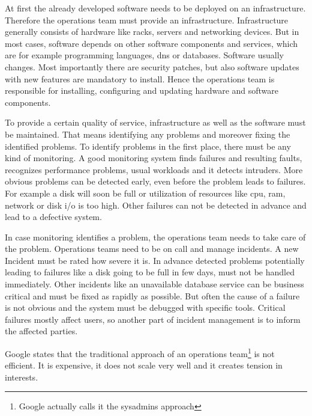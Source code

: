 At first the already developed software needs to be deployed on an infrastructure. Therefore the operations team must provide an infrastructure. Infrastructure generally consists of hardware like racks, servers and networking devices. But in most cases, software depends on other software components and services, which are for example programming languages, dns or databases. Software usually changes. Most importantly there are security patches, but also software updates with new features are mandatory to install. Hence the operations team is responsible for installing, configuring and updating hardware and software components.

To provide a certain quality of service, infrastructure as well as the software must be maintained. That means identifying any problems and moreover fixing the identified problems. To identify problems in the first place, there must be any kind of monitoring. A good monitoring system\cite[p. 127/8]{devops} finds failures and resulting faults, recognizes performance problems, usual workloads and it detects intruders. More obvious problems can be detected early, even before the problem leads to failures. For example a disk will soon be full or utilization of resources like cpu, ram, network or disk i/o is too high. Other failures can not be detected in advance and lead to a defective system.

In case monitoring identifies a problem, the operations team needs to take care of the problem. Operations teams need to be on call and manage incidents. A new Incident must be rated how severe it is. In advance detected problems potentially leading to failures like a disk going to be full in few days, must not be handled immediately. Other incidents like an unavailable database service can be business critical and must be fixed as rapidly as possible. But often the cause of a failure is not obvious and the system must be debugged with specific tools. Critical failures mostly affect users, so another part of incident management is to inform the affected parties.

Google states that the traditional approach of an operations team\footnote{Google actually calls it the sysadmins approach} is not efficient. It is expensive, it does not scale very well and it creates tension in interests\cite[p. 3/4]{site_reliability}.

